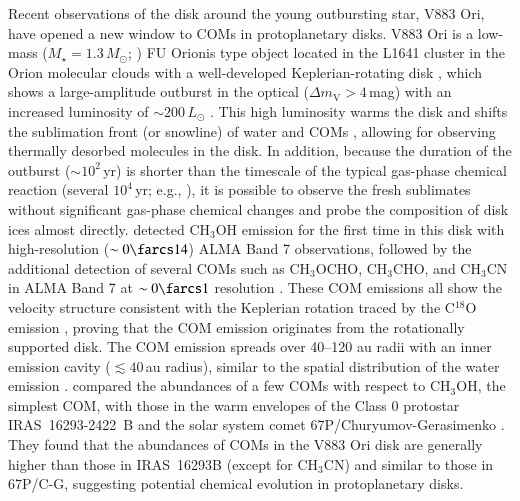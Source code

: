 \documentclass[linenumbers, twocolumn, twocolappendix, astrosymb, times]{aastex631}
\newcommand{\methanol}{CH$_3$OH\xspace}
\newcommand{\acetaldehyde}{CH$_3$CHO\xspace}
\newcommand{\methylformate}{CH$_3$OCHO\xspace}
\begin{document}
Recent observations of the disk around the young outbursting star, V883 Ori, have opened a new window to COMs in protoplanetary disks. V883 Ori is a low-mass ($M_\star = 1.3\,M_\odot$; \citealt{Cieza2016}) FU Orionis type object located in the L1641 cluster in the Orion molecular clouds \citep[$d\approx400$\,pc;][]{Strom1993} with a well-developed Keplerian-rotating disk \citep{Cieza2016}, which shows a large-amplitude outburst in the optical ($\Delta m_\mathrm{V} > 4$\,mag) with an increased luminosity of $\sim200\,L_\odot$ \citep{Furlan2016}. This high luminosity warms the disk and shifts the sublimation front (or snowline) of water and COMs \citep{Tobin2023}, allowing for observing thermally desorbed molecules in the disk. In addition, because the duration of the outburst ($\sim10^2$\,yr) is shorter than the timescale of the typical gas-phase chemical reaction (several $10^4$\,yr; e.g., \citealt{Nomura2009}), it is possible to observe the fresh sublimates without significant gas-phase chemical changes and probe the composition of disk ices almost directly. 
\citet{vantHoff2018} detected \methanol emission for the first time in this disk with high-resolution ($\sim0\farcs14$) ALMA Band 7 observations, followed by the additional detection of several COMs such as \methylformate, \acetaldehyde, and CH$_3$CN in ALMA Band 7 at $\sim0\farcs1$ resolution \citep{Lee2019}. These COM emissions all show the velocity structure consistent with the Keplerian rotation traced by the C$^{18}$O emission \citep{Cieza2016, vantHoff2018}, proving that the COM emission originates from the rotationally supported disk. The COM emission spreads over 40--120 au radii with an inner emission cavity ($\lesssim40$\,au radius), similar to the spatial distribution of the water emission \citep{Tobin2023}. \citet{Lee2019} compared the abundances of a few COMs with respect to \methanol, the simplest COM, with those in the warm envelopes of the Class 0 protostar IRAS~16293-2422~B \citep[hereafter IRAS~16293B; e.g.,][]{Jorgensen2016} and the solar system comet 67P/Churyumov-Gerasimenko \citep[hereafter 67P/C-G; e.g.,][]{Altwegg2019}. They found that the abundances of COMs in the V883 Ori disk are generally higher than those in IRAS~16293B (except for CH$_3$CN) and similar to those in 67P/C-G, suggesting potential chemical evolution in protoplanetary disks.
\end{document}
